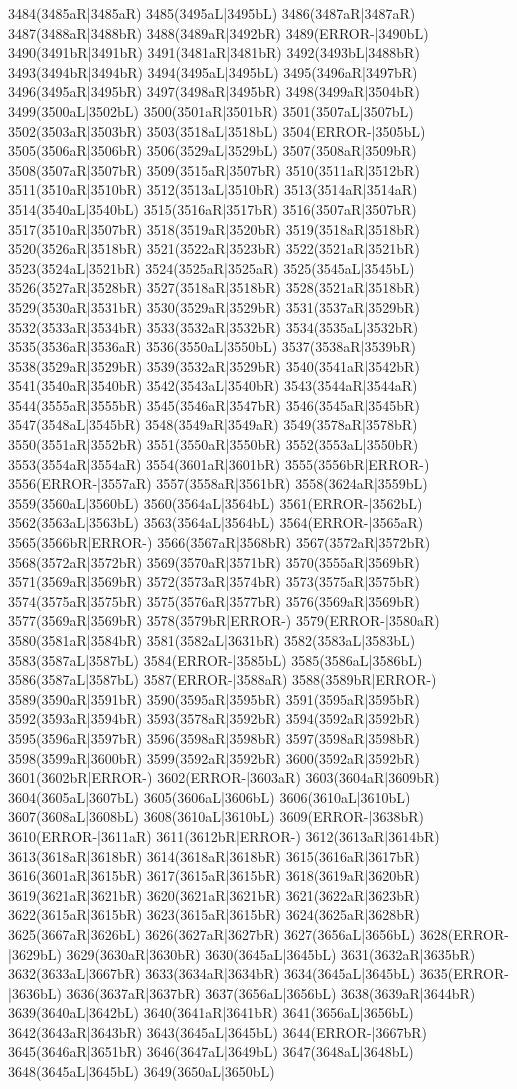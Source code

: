 3484(3485aR|3485aR) 3485(3495aL|3495bL) 3486(3487aR|3487aR) 3487(3488aR|3488bR) 3488(3489aR|3492bR) 3489(ERROR-|3490bL) 3490(3491bR|3491bR) 3491(3481aR|3481bR) 3492(3493bL|3488bR) 3493(3494bR|3494bR) 3494(3495aL|3495bL) 3495(3496aR|3497bR) 3496(3495aR|3495bR) 3497(3498aR|3495bR) 3498(3499aR|3504bR) 3499(3500aL|3502bL) 3500(3501aR|3501bR) 3501(3507aL|3507bL) 3502(3503aR|3503bR) 3503(3518aL|3518bL) 3504(ERROR-|3505bL) 3505(3506aR|3506bR) 3506(3529aL|3529bL) 3507(3508aR|3509bR) 3508(3507aR|3507bR) 3509(3515aR|3507bR) 3510(3511aR|3512bR) 3511(3510aR|3510bR) 3512(3513aL|3510bR) 3513(3514aR|3514aR) 3514(3540aL|3540bL) 3515(3516aR|3517bR) 3516(3507aR|3507bR) 3517(3510aR|3507bR) 3518(3519aR|3520bR) 3519(3518aR|3518bR) 3520(3526aR|3518bR) 3521(3522aR|3523bR) 3522(3521aR|3521bR) 3523(3524aL|3521bR) 3524(3525aR|3525aR) 3525(3545aL|3545bL) 3526(3527aR|3528bR) 3527(3518aR|3518bR) 3528(3521aR|3518bR) 3529(3530aR|3531bR) 3530(3529aR|3529bR) 3531(3537aR|3529bR) 3532(3533aR|3534bR) 3533(3532aR|3532bR) 3534(3535aL|3532bR) 3535(3536aR|3536aR) 3536(3550aL|3550bL) 3537(3538aR|3539bR) 3538(3529aR|3529bR) 3539(3532aR|3529bR) 3540(3541aR|3542bR) 3541(3540aR|3540bR) 3542(3543aL|3540bR) 3543(3544aR|3544aR) 3544(3555aR|3555bR) 3545(3546aR|3547bR) 3546(3545aR|3545bR) 3547(3548aL|3545bR) 3548(3549aR|3549aR) 3549(3578aR|3578bR) 3550(3551aR|3552bR) 3551(3550aR|3550bR) 3552(3553aL|3550bR) 3553(3554aR|3554aR) 3554(3601aR|3601bR) 3555(3556bR|ERROR-) 3556(ERROR-|3557aR) 3557(3558aR|3561bR) 3558(3624aR|3559bL) 3559(3560aL|3560bL) 3560(3564aL|3564bL) 3561(ERROR-|3562bL) 3562(3563aL|3563bL) 3563(3564aL|3564bL) 3564(ERROR-|3565aR) 3565(3566bR|ERROR-) 3566(3567aR|3568bR) 3567(3572aR|3572bR) 3568(3572aR|3572bR) 3569(3570aR|3571bR) 3570(3555aR|3569bR) 3571(3569aR|3569bR) 3572(3573aR|3574bR) 3573(3575aR|3575bR) 3574(3575aR|3575bR) 3575(3576aR|3577bR) 3576(3569aR|3569bR) 3577(3569aR|3569bR) 3578(3579bR|ERROR-) 3579(ERROR-|3580aR) 3580(3581aR|3584bR) 3581(3582aL|3631bR) 3582(3583aL|3583bL) 3583(3587aL|3587bL) 3584(ERROR-|3585bL) 3585(3586aL|3586bL) 3586(3587aL|3587bL) 3587(ERROR-|3588aR) 3588(3589bR|ERROR-) 3589(3590aR|3591bR) 3590(3595aR|3595bR) 3591(3595aR|3595bR) 3592(3593aR|3594bR) 3593(3578aR|3592bR) 3594(3592aR|3592bR) 3595(3596aR|3597bR) 3596(3598aR|3598bR) 3597(3598aR|3598bR) 3598(3599aR|3600bR) 3599(3592aR|3592bR) 3600(3592aR|3592bR) 3601(3602bR|ERROR-) 3602(ERROR-|3603aR) 3603(3604aR|3609bR) 3604(3605aL|3607bL) 3605(3606aL|3606bL) 3606(3610aL|3610bL) 3607(3608aL|3608bL) 3608(3610aL|3610bL) 3609(ERROR-|3638bR) 3610(ERROR-|3611aR) 3611(3612bR|ERROR-) 3612(3613aR|3614bR) 3613(3618aR|3618bR) 3614(3618aR|3618bR) 3615(3616aR|3617bR) 3616(3601aR|3615bR) 3617(3615aR|3615bR) 3618(3619aR|3620bR) 3619(3621aR|3621bR) 3620(3621aR|3621bR) 3621(3622aR|3623bR) 3622(3615aR|3615bR) 3623(3615aR|3615bR) 3624(3625aR|3628bR) 3625(3667aR|3626bL) 3626(3627aR|3627bR) 3627(3656aL|3656bL) 3628(ERROR-|3629bL) 3629(3630aR|3630bR) 3630(3645aL|3645bL) 3631(3632aR|3635bR) 3632(3633aL|3667bR) 3633(3634aR|3634bR) 3634(3645aL|3645bL) 3635(ERROR-|3636bL) 3636(3637aR|3637bR) 3637(3656aL|3656bL) 3638(3639aR|3644bR) 3639(3640aL|3642bL) 3640(3641aR|3641bR) 3641(3656aL|3656bL) 3642(3643aR|3643bR) 3643(3645aL|3645bL) 3644(ERROR-|3667bR) 3645(3646aR|3651bR) 3646(3647aL|3649bL) 3647(3648aL|3648bL) 3648(3645aL|3645bL) 3649(3650aL|3650bL) 